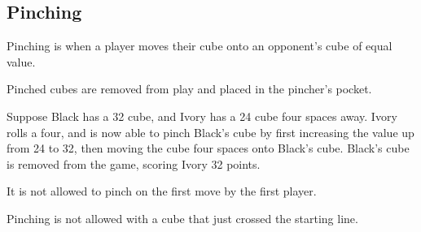 \subsection{Pinching}\label{sec:pinching}
Pinching is when a player moves their cube onto an opponent's cube of equal value.

Pinched cubes are removed from play and placed in the pincher's pocket.

\example Suppose Black has a 32 cube, and Ivory has a 24 cube four spaces away. 
Ivory rolls a four, and is now able to pinch Black's cube by first increasing the value up from 24 to 32, then moving the cube four spaces onto Black's cube.
Black's cube is removed from the game, scoring Ivory 32 points.

\note It is not allowed to pinch on the first move by the first player.

\note Pinching is not allowed with a cube that just crossed the starting line.